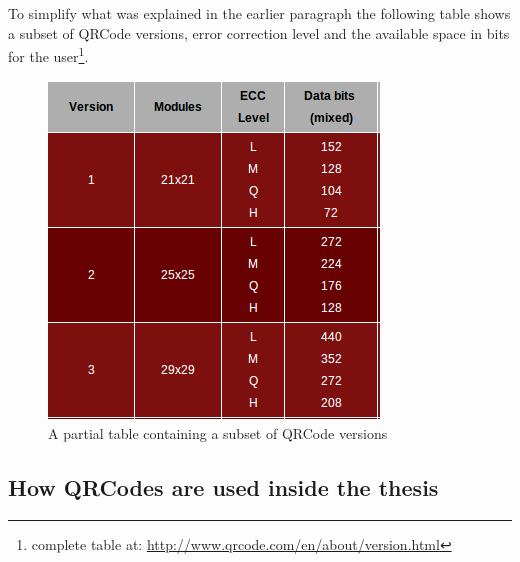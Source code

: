 \newpage
To simplify what was explained in the earlier paragraph the following table shows a subset of QRCode versions, error correction level and the available space in bits for the user\footnote{complete table at: \protect\url{http://www.qrcode.com/en/about/version.html}}.

\vspace{2.5cm}
\begin{figure}[hbt]
    \centering
    \includegraphics[scale=0.95]{img/qrversion.png}
    \caption{A partial table containing a subset of QRCode versions \label{qrversion}}
\end{figure}

\newpage

\subsection{How QRCodes are used inside the thesis}





   













  
